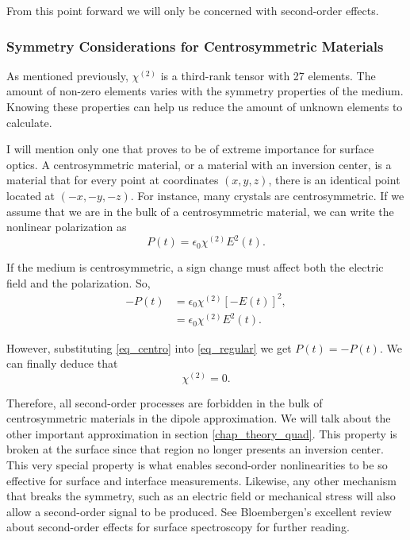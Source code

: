 From this point forward we will only be concerned with second-order effects.

\subsubsection{Symmetry Considerations for Centrosymmetric Materials}\label{chap_theory_sym}
As mentioned previously, $\chi^{(2)}$ is a third-rank tensor with 27 elements. The amount of non-zero elements varies with the symmetry properties of the medium. Knowing these properties can help us reduce the amount of unknown elements to calculate.

I will mention only one that proves to be of extreme importance for surface optics. A centrosymmetric material, or a material with an inversion center, is a material that for every point at coordinates $(x,y,z)$, there is an identical point located at $(-x,-y,-z)$. For instance, many crystals are centrosymmetric. If we assume that we are in the bulk of a centrosymmetric material, we can write the nonlinear polarization as
\begin{equation}
{P}(t) = \epsilon_{0}\chi^{(2)}{E}^{2}(t).\label{eq_regular}
\end{equation}

If the medium is centrosymmetric, a sign change must affect both the electric field and the polarization. So,
\begin{align}
-{P}(t) &= \epsilon_{0}\chi^{(2)}\left[-{E}(t)\right]^{2},\\
              &= \epsilon_{0}\chi^{(2)}{E}^{2}(t).\label{eq_centro}
\end{align}

However, substituting \eqref{eq_centro} into \eqref{eq_regular} we get ${P}(t) = -{P}(t)$. We can finally deduce that
\begin{equation}
\chi^{(2)} = 0.
\end{equation}

Therefore, all second-order processes are forbidden in the bulk of centrosymmetric materials in the dipole approximation. We will talk about the other important approximation in section \ref{chap_theory_quad}. This property is broken at the surface since that region no longer presents an inversion center.  This very special property is what enables second-order nonlinearities to be so effective for surface and interface measurements. Likewise, any other mechanism that breaks the symmetry, such as an electric field or mechanical stress will also allow a second-order signal to be produced. See Bloembergen's \cite{bloembergen1999surface} excellent review about second-order effects for surface spectroscopy for further reading. 

